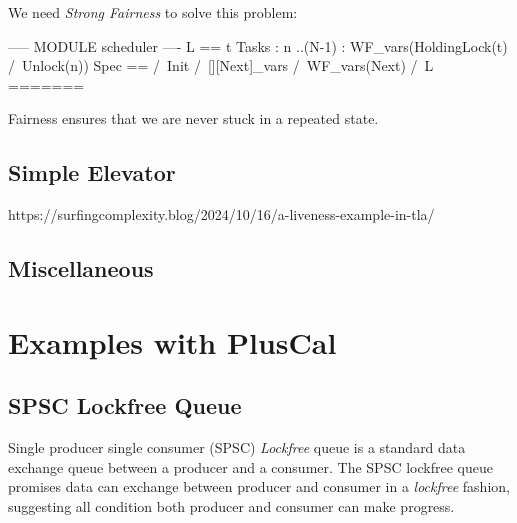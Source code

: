 \documentclass{report}
\begin{document}
We need \textit{Strong Fairness} to solve this problem:
\begin{tla}
----- MODULE scheduler ---- 
L ==
    \A t \in Tasks :
        \A n ..(N-1) :
            WF_vars(HoldingLock(t) /\ Unlock(n))
Spec ==
  /\ Init
  /\ [][Next]_vars
  /\ WF_vars(Next)
  /\ L 
======= 
\end{tla}
\begin{tlatex}
\@x{}\moduleLeftDash{}\moduleRightDash\@xx{}%
%
%
%
%
%
%
%
%
%
\@x{}\bottombar\@xx{}%
\end{tlatex}
\newline

Fairness ensures that we are never stuck in a repeated state.

\chapter{Simple Elevator}

https://surfingcomplexity.blog/2024/10/16/a-liveness-example-in-tla/

\chapter{Miscellaneous}

\part{Examples with PlusCal}

\chapter{SPSC Lockfree Queue}

Single producer single consumer (SPSC) \textit{Lockfree} queue is a standard
data exchange queue between a producer and a consumer. The SPSC lockfree queue
promises data can exchange between producer and consumer in a \textit{lockfree}
fashion, suggesting all condition both producer and consumer can make
progress.\newline
\end{document}

